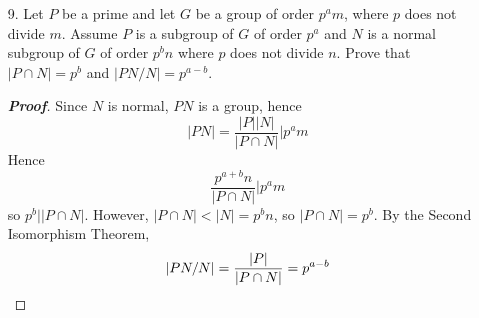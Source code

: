 \documentclass[12pt,leqno]{book}
\theoremstyle{definition}
\newenvironment{Proof}{\begin{proof}[\textnormal{\textbf{Proof}}]}{\end{proof}}
\begin{document}
\begin{enumerate}
\begin{Proof}
\end{Proof}

 \item [9.] Let $P$ be a prime and let $G$ be a group of order $p^am$, where $p$ does not divide $m$. Assume $P$ is a subgroup of $G$ of order $p^a$ and $N$ is a normal subgroup of $G$ of order $p^bn$ where $p$ does not divide $n$. Prove that $|P\cap N|=p^b$ and $|PN/N|=p^{a-b}$.
\begin{Proof}
 Since $N$ is normal, $PN$ is a group, hence \[|PN|=\frac{|P||N|}{|P\cap N|}|p^am\] Hence \[\frac{p^{a+b}n}{|P\cap N|}|p^am\] so $p^b||P\cap N|$. However, $|P\cap N|<|N|=p^bn$, so $|P\cap N|=p^b$. By the Second Isomorphism Theorem, \[|PN/N|=\frac{|P|}{|P\cap N|}=p^{a-b}\qedhere\]
\end{Proof}

\end{enumerate}
\end{document}
